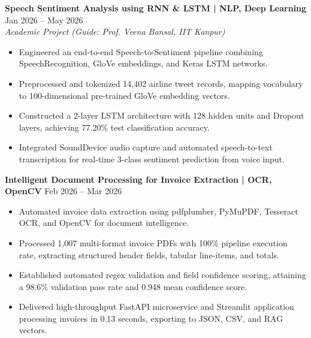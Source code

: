 \documentclass[10pt]{article}
\begin{document}
\textbf{Speech Sentiment Analysis using RNN \& LSTM | NLP, Deep Learning} \hfill Jan 2026 -- May 2026\\
\textit{Academic Project (Guide: Prof. Veena Bansal, IIT Kanpur)}
\begin{itemize}[noitemsep, topsep=2pt, partopsep=0pt, parsep=1.5pt]
    \item Engineered an end-to-end Speech-to-Sentiment pipeline combining SpeechRecognition, GloVe embeddings, and Keras LSTM networks.
    \item Preprocessed and tokenized 14,402 airline tweet records, mapping vocabulary to 100-dimensional pre-trained GloVe embedding vectors.
    \item Constructed a 2-layer LSTM architecture with 128 hidden units and Dropout layers, achieving 77.20\% test classification accuracy.
    \item Integrated SoundDevice audio capture and automated speech-to-text transcription for real-time 3-class sentiment prediction from voice input.
\end{itemize}

\vspace{6pt}

\textbf{Intelligent Document Processing for Invoice Extraction | OCR, OpenCV} \hfill Feb 2026 -- Mar 2026
\begin{itemize}[noitemsep, topsep=2pt, partopsep=0pt, parsep=1.5pt]
    \item Automated invoice data extraction using pdfplumber, PyMuPDF, Tesseract OCR, and OpenCV for document intelligence.
    \item Processed 1,007 multi-format invoice PDFs with 100\% pipeline execution rate, extracting structured header fields, tabular line-items, and totals.
    \item Established automated regex validation and field confidence scoring, attaining a 98.6\% validation pass rate and 0.948 mean confidence score.
    \item Delivered high-throughput FastAPI microservice and Streamlit application processing invoices in 0.13 seconds, exporting to JSON, CSV, and RAG vectors.
\end{itemize}

\vspace{6pt}
\end{document}
